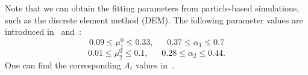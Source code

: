 \noindent
Note that we can obtain the fitting parameters from particle-based simulations, such as the discrete element method (DEM). The following parameter values are introduced in~\cite{jop_constitutive_2006} and~\cite{srivastava_viscometric_2021}:
    \[
    0.09 \leq \mu_1^0 \leq 0.33, 
    \ \ \ \ \ \ \ 
    0.37 \leq \alpha_1 \leq 0.7
    \]
        \[
    0.01 \leq \mu_2^0 \leq 0.1, 
    \ \ \ \ \ \ \ 
    0.28 \leq \alpha_2 \leq 0.44.
    \]
One can find the corresponding $A_i$ values in~\cite{srivastava_viscometric_2021}.

